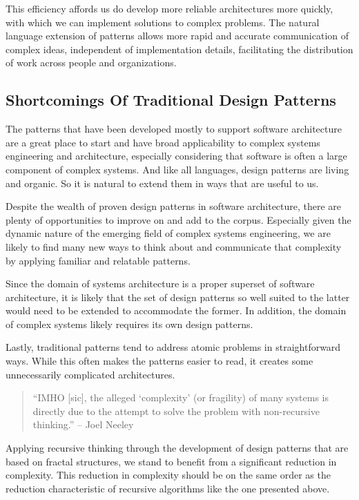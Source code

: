 \documentclass[jou,apacite]{apa6}
\begin{document}
This efficiency affords us do develop more reliable architectures more quickly, with which we can implement solutions to complex problems.  The natural language extension of patterns allows more rapid and accurate communication of complex ideas, independent of implementation details, facilitating the distribution of work across people and organizations.

\subsection{Shortcomings Of Traditional Design Patterns}
The patterns that have been developed mostly to support software architecture are a great place to start and have broad applicability to complex systems engineering and architecture, especially considering that software is often a large component of complex systems.  And like all languages, design patterns are living and organic. So it is natural to extend them in ways that are useful to us.

Despite the wealth of proven design patterns in software architecture, there are plenty of opportunities to improve on and add to the corpus.  Especially given the dynamic nature of the emerging field of complex systems engineering, we are likely to find many new ways to think about and communicate that complexity by applying familiar and relatable patterns.

Since the domain of systems architecture is a proper superset of software architecture, it is likely that the set of design patterns so well suited to the latter would need to be extended to accommodate the former.  In addition, the domain of complex systems likely requires its own design patterns. 

Lastly, traditional patterns tend to address atomic problems in straightforward ways.  While this often makes the patterns easier to read, it creates some unnecessarily complicated architectures.

\begin{quote}
  ``IMHO [sic], the alleged `complexity' (or fragility) of many systems is directly due to the attempt to solve the problem with non-recursive thinking.'' -- Joel Neeley
\end{quote}

Applying recursive thinking through the development of design patterns that are based on fractal structures, we stand to benefit from a significant reduction in complexity.  This reduction in complexity should be on the same order as the reduction characteristic of recursive algorithms like the one presented above.
\end{document}
